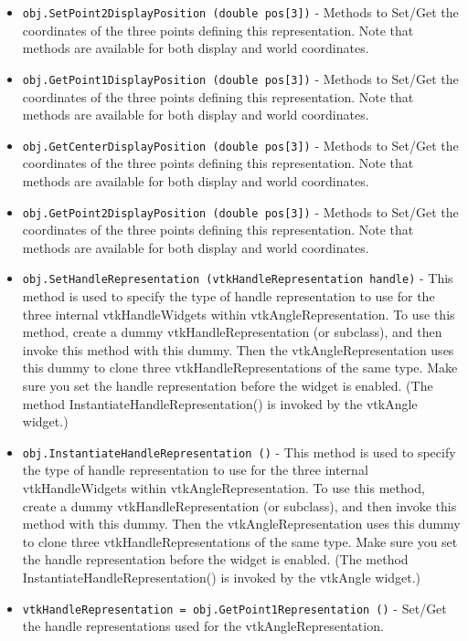 \begin{itemize}
\item  \verb|obj.SetPoint2DisplayPosition (double pos[3])| -  Methods to Set/Get the coordinates of the three points defining
 this representation. Note that methods are available for both
 display and world coordinates.

\item  \verb|obj.GetPoint1DisplayPosition (double pos[3])| -  Methods to Set/Get the coordinates of the three points defining
 this representation. Note that methods are available for both
 display and world coordinates.

\item  \verb|obj.GetCenterDisplayPosition (double pos[3])| -  Methods to Set/Get the coordinates of the three points defining
 this representation. Note that methods are available for both
 display and world coordinates.

\item  \verb|obj.GetPoint2DisplayPosition (double pos[3])| -  Methods to Set/Get the coordinates of the three points defining
 this representation. Note that methods are available for both
 display and world coordinates.

\item  \verb|obj.SetHandleRepresentation (vtkHandleRepresentation handle)| -  This method is used to specify the type of handle representation to use
 for the three internal vtkHandleWidgets within vtkAngleRepresentation.
 To use this method, create a dummy vtkHandleRepresentation (or
 subclass), and then invoke this method with this dummy. Then the
 vtkAngleRepresentation uses this dummy to clone three
 vtkHandleRepresentations of the same type. Make sure you set the handle
 representation before the widget is enabled. (The method
 InstantiateHandleRepresentation() is invoked by the vtkAngle widget.)

\item  \verb|obj.InstantiateHandleRepresentation ()| -  This method is used to specify the type of handle representation to use
 for the three internal vtkHandleWidgets within vtkAngleRepresentation.
 To use this method, create a dummy vtkHandleRepresentation (or
 subclass), and then invoke this method with this dummy. Then the
 vtkAngleRepresentation uses this dummy to clone three
 vtkHandleRepresentations of the same type. Make sure you set the handle
 representation before the widget is enabled. (The method
 InstantiateHandleRepresentation() is invoked by the vtkAngle widget.)

\item  \verb|vtkHandleRepresentation = obj.GetPoint1Representation ()| -  Set/Get the handle representations used for the vtkAngleRepresentation.


\end{itemize}
